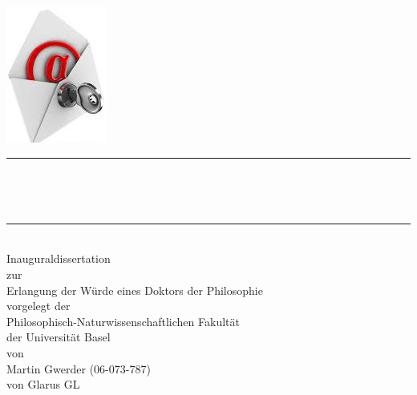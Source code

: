\begin{titlepage}
\pagecolor{orange}\afterpage{\nopagecolor}
\begin{center}
\includegraphics[height=0.4\textwidth]{./inc/logo}~\\[1cm]

\newcommand{\HRule}{\rule{\linewidth}{0.5mm}}
\HRule \\[0.4cm]
{ \huge \bfseries \makeatletter\@title\par\normalsize\@subtitle\makeatother \\[0.4cm] }

\HRule \\[1.5cm]

{\large Inauguraldissertation}\\
zur\\
Erlangung der W\"urde eines Doktors der Philosophie\\
vorgelegt der\\
Philosophisch-Naturwissenschaftlichen Fakult\"at\\
der Universit\"at Basel\\
von\\
Martin Gwerder (06-073-787)\\
von Glarus GL\\

\end{center}
\end{titlepage}
